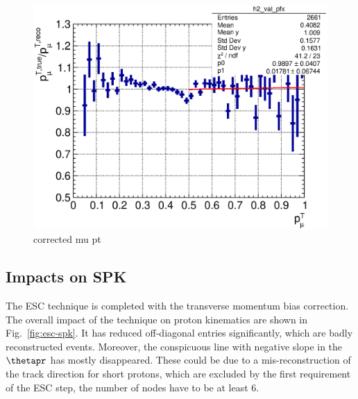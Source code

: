     \begin{figure}[h]
       \centering
       \includegraphics[width=\sgfidwid\textwidth]{figures/sel/mu_pt_vs_cor_mu_pt_bias_hist2d_al14.eps} 
       \caption{corrected mu pt}
       \label{fig:esc-cormupt}
    \end{figure}

    \subsection{Impacts on SPK}
    The ESC technique is completed with the transverse momentum bias correction.
    The overall impact of the technique on proton kinematics are shown in Fig.~\ref{fig:esc-spk}.
    It has reduced off-diagonal entries significantly, which are badly reconstructed events.
    Moreover, the conspicuous line with negative slope in the $\thetapr$ has mostly disappeared.
    These could be due to a mis-reconstruction of the track direction for short protons, which are excluded by the first requirement of the ESC step, the number of nodes have to be at least $6$. 
    
